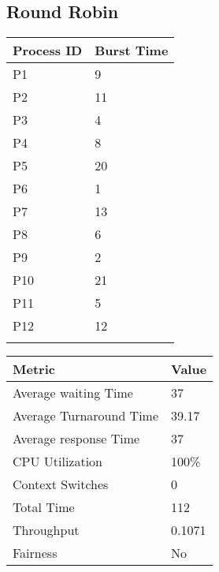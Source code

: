 \documentclass{article}
\begin{document}
\subsection{Round Robin}
\vspace{\baselineskip}
\hspace{1cm}
\begin{minipage}[t]{0.3\textwidth}
    \begin{tabularx}{\textwidth}{|l|X|}
    \hline
    \rowcolor{darkblue}
    \textbf{Process ID} & \textbf{Burst Time}\\
    \hline
    \rowcolor{lightblue}
    P1 & 9 \\
    P2 & 11 \\
    \rowcolor{lightblue}
    P3 & 4 \\
    P4 & 8 \\
    \rowcolor{lightblue}
    P5 & 20 \\
    P6 & 1 \\
    \rowcolor{lightblue}
    P7 & 13 \\
    P8 & 6 \\
    \rowcolor{lightblue}
    P9 & 2 \\
    P10 & 21 \\
    \rowcolor{lightblue}
    P11 & 5 \\
    P12 & 12 \\
    \rowcolor{lightblue}
    \hline
    \end{tabularx}
\end{minipage}
\hspace{2cm}
\begin{minipage}[t!]{0.35\textwidth}
    \begin{tabularx}{\textwidth}{|l|X|}
    \hline
    \rowcolor{darkblue}
    \textbf{Metric} & \textbf{Value} \\
    \hline
    \rowcolor{lightblue}
    Average waiting Time & 37 \\
    Average Turnaround Time & 39.17 \\
    \rowcolor{lightblue}
    Average response Time & 37 \\
    CPU Utilization & 100\% \\
    \rowcolor{lightblue}
    Context Switches & 0 \\
    Total Time & 112 \\
    \rowcolor{lightblue}
    Throughput & 0.1071 \\
    Fairness & No \\
    \hline
    \end{tabularx}
\end{minipage}
\end{document}
